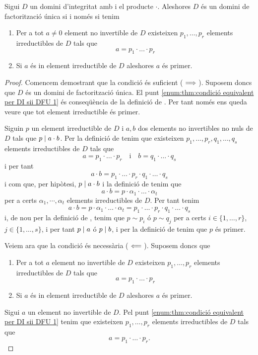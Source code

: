 \documentclass[../Apunts.tex]{subfiles}
\begin{document}
	\begin{theorem}
		\label{thm:condició equivalent per DI sii DFU}
		Sigui \(D\) un domini d'integritat amb i el producte \(\cdot\). Aleshores \(D\) és un domini de factorització única si i només si tenim
		\begin{enumerate}
			\item\label{enum:thm:condició equivalent per DI sii DFU 1} Per a tot \(a\neq0\) element no invertible de \(D\) existeixen \(p_{1},\dots,p_{r}\) elements irreductibles de \(D\) tals que
			\[a=p_{1}\cdot\ldots\cdot p_{r}\]
			\item\label{enum:thm:condició equivalent per DI sii DFU 2} Si \(a\) és in element irreductible de \(D\) aleshores \(a\) és primer.
		\end{enumerate}
		\begin{proof}
			Comencem demostrant que la condició és suficient (\(\implies\)). Suposem doncs que \(D\) és un domini de factorització única. El punt \eqref{enum:thm:condició equivalent per DI sii DFU 1} és conseqüència de la definició de . Per tant només ens queda veure que tot element irreductible és primer.
			
			Siguin \(p\) un element irreductible de \(D\) i \(a,b\) dos elements no invertibles no nuls de \(D\) tals que \(p\mathrel{|} a\cdot b\). Per la definició de  tenim que existeixen \(p_{1},\dots,p_{r},q_{1},\dots,q_{s}\) elements irreductibles de \(D\) tals que
			\[a=p_{1}\cdot\ldots\cdot p_{r}\quad\text{i}\quad b=q_{1}\cdot\ldots\cdot q_{s}\]
			i per tant
			\[a\cdot b=p_{1}\cdot\ldots\cdot p_{r}\cdot q_{1}\cdot\ldots\cdot q_{s}\]
			i com que, per hipòtesi, \(p\mathrel{|} a\cdot b\) i la definició de  tenim que
			\[a\cdot b=p\cdot\alpha_{1}\cdot\ldots\cdot\alpha_{t}\]
			per a certs \(\alpha_{1},\cdots,\alpha_{t}\) elements irreductibles de \(D\). Per tant tenim
			\[a\cdot b=p\cdot\alpha_{1}\cdot\ldots\cdot\alpha_{t}=p_{1}\cdot\ldots\cdot p_{r}\cdot q_{1}\cdot\ldots\cdot q_{s}\]
			i, de nou per la definició de , tenim que \(p\sim p_{i}\) ó \(p\sim q_{j}\) per a certs \(i\in\{1,\dots,r\}\), \(j\in\{1,\dots,s\}\), i per tant \(p\mathrel{|} a\) ó \(p\mathrel{|} b\), i per la definició de  tenim que \(p\) és primer.
			
			Veiem ara que la condició és necessària (\(\impliedby\)). Suposem doncs que
			\begin{enumerate}
				\item Per a tot \(a\) element no invertible de \(D\) existeixen \(p_{1},\dots,p_{r}\) elements irreductibles de \(D\) tals que
				\[a=p_{1}\cdot\ldots\cdot p_{r}\]
				\item Si \(a\) és in element irreductible de \(D\) aleshores \(a\) és primer.
			\end{enumerate}
			Sigui \(a\) un element no invertible de \(D\). Pel punt \eqref{enum:thm:condició equivalent per DI sii DFU 1} tenim que existeixen \(p_{1},\dots,p_{r}\) elements irreductibles de \(D\) tals que
			\[a=p_{1}\cdot\ldots\cdot p_{r}.\]
			

\end{proof}
\end{theorem}
\end{document}
